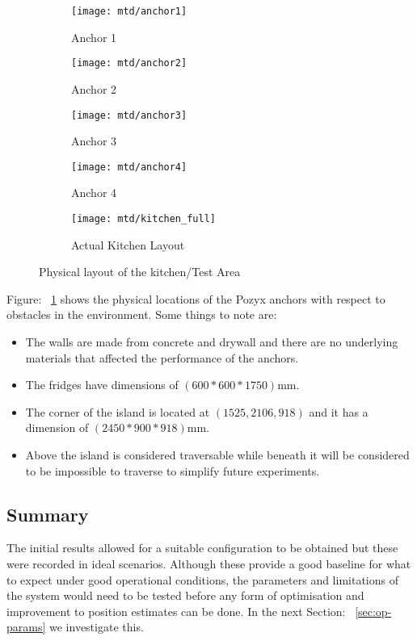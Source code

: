 \begin{figure}[h!]
    \centering
    \begin{subfigure}[b]{0.4\textwidth}
            \texttt{[image: mtd/anchor1]}
            \caption{Anchor 1}
    \end{subfigure}
    \begin{subfigure}[b]{0.4\textwidth}
            \texttt{[image: mtd/anchor2]}
            \caption{Anchor 2}
    \end{subfigure}

    \begin{subfigure}[b]{0.4\textwidth}
            \texttt{[image: mtd/anchor3]}
            \caption{Anchor 3}
    \end{subfigure}
    \begin{subfigure}[b]{0.4\textwidth}
            \texttt{[image: mtd/anchor4]}
            \caption{Anchor 4}
    \end{subfigure}

    \begin{subfigure}[b]{0.7\textwidth}
            \texttt{[image: mtd/kitchen\_full]}
            \caption{Actual Kitchen Layout}
    \end{subfigure}
    \caption{Physical layout of the kitchen/Test Area}
    \label{fig:kitchen}
\end{figure}
\medskip
Figure: ~\ref{fig:kitchen} shows the physical locations of the Pozyx anchors with respect to obstacles in the environment.
Some things to note are:
\begin{itemize}
    \item The walls are made from concrete and drywall and there are no underlying materials that affected the performance of the anchors.
    \item The fridges have dimensions of $(600*600*1750)$mm.
    \item The corner of the island is located at $(1525,2106,918)$ and it has a dimension of $(2450*900*918)$mm.
    \item Above the island is considered traversable while beneath it will be considered to be impossible to traverse to simplify future experiments.
\end{itemize}

\subsection*{Summary}
The initial results allowed for a suitable configuration to be obtained but these were recorded in ideal scenarios.
Although these provide a good baseline for what to expect under good operational conditions, the parameters and limitations of the system would need to be tested before any form of optimisation
and improvement to position estimates can be done.
In the next Section: ~\ref{sec:op-params} we investigate this.

\newpage

\newpage
